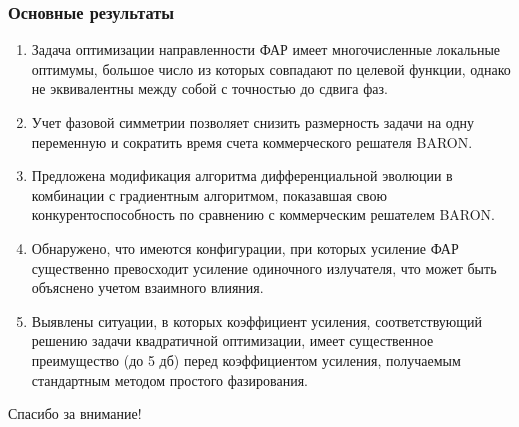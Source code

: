 \begin{frame}
    \frametitle{Основные результаты}
    \begin{enumerate}
 \item Задача оптимизации направленности ФАР имеет многочисленные локальные оптимумы, большое число из которых совпадают по целевой функции, однако не эквивалентны между собой с точностью до сдвига фаз.
  \item Учет фазовой симметрии позволяет снизить размерность задачи на одну переменную и сократить время счета коммерческого решателя BARON.
 \item Предложена модификация алгоритма дифференциальной эволюции в комбинации с градиентным алгоритмом, показавшая свою конкурентоспособность по сравнению с коммерческим решателем BARON.
  \item Обнаружено, что имеются конфигурации, при которых усиление ФАР существенно превосходит усиление одиночного излучателя, что может быть объяснено учетом взаимного влияния.
  \item Выявлены ситуации, в которых коэффициент усиления, соответствующий решению задачи квадратичной оптимизации, имеет существенное преимущество (до 5 дб) перед коэффициентом усиления, получаемым стандартным методом простого фазирования.
\end{enumerate}
\end{frame}

\begin{frame} %
    \begin{center}
        \Huge
        Спасибо за внимание!
    \end{center}
\end{frame}



